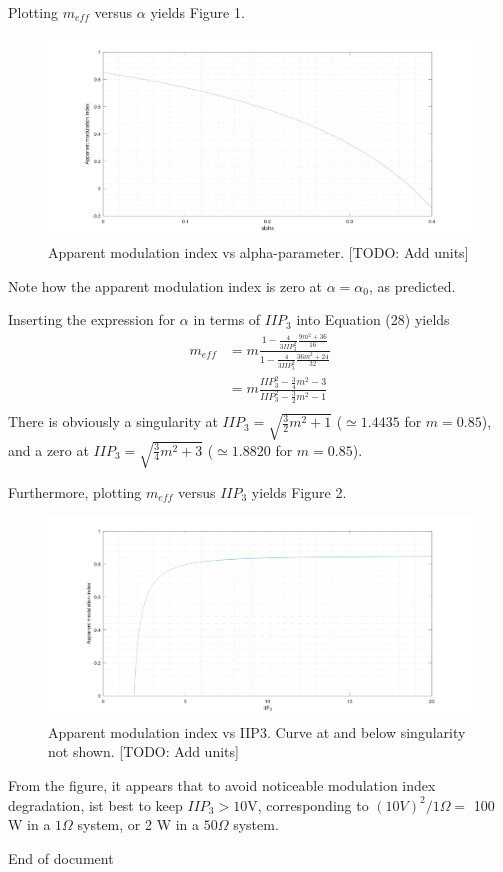\documentclass[12pt]{article}
\begin{document}
Plotting $m_{eff}$ versus $\alpha$ yields Figure 1.
\begin{figure}[!h]
\centering
\includegraphics[scale=.25]{app_mod_index_alpha}
\caption{Apparent modulation index vs alpha-parameter. [TODO: Add units]}
\end{figure}

Note how the apparent modulation index is zero at $\alpha = \alpha_0$, as predicted.

Inserting the expression for $\alpha$ in terms of $IIP_3$ into Equation (28) yields
\begin{equation}
\begin{aligned}
m_{eff} &= m \frac{1 - \frac{4}{3 IIP_3^2} \frac{9 m^2 + 36}{16}}{1 - \frac{4}{3 IIP_3^2} \frac{36 m^2 +24}{32}} \\
        &= m \frac{IIP_3^2 - \frac{3}{4} m^2 - 3}{IIP_3^2 - \frac{3}{2} m^2 - 1} \\
\end{aligned}
\end{equation}
There is obviously a singularity at $IIP_3 = \sqrt{\frac{3}{2} m^2 + 1}$ ($\simeq 1.4435$ for $m = 0.85$), and a zero at $IIP_3 = \sqrt{\frac{3}{4} m^2 + 3}$ ($\simeq 1.8820$ for $m = 0.85$).

Furthermore, plotting $m_{eff}$ versus $IIP_3$ yields Figure 2.
\begin{figure}[!h]
\centering
\includegraphics[scale=.25]{app_mod_index_iip3}
\caption{Apparent modulation index vs IIP3. Curve at and below singularity not shown. [TODO: Add units]}
\end{figure}
From the figure, it appears that to avoid noticeable modulation index degradation, ist best to keep $IIP_3 > 10 $V,
corresponding to $(10V)^2 / 1\Omega =$ 100 W in a $1 \Omega$ system, or 2 W in a $50 \Omega$ system.


{\tiny \begin{center} End of document \end{center}}
\end{document}
